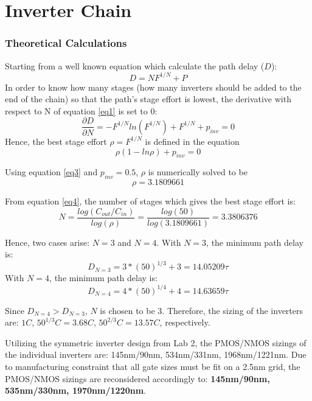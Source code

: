 \documentclass[letterpaper, 11pt]{article}
\begin{document}
\part{Inverter Chain}
\label{part1}

\section{Theoretical Calculations}
\label{sec:theoretical}

Starting from a well known equation which calculate the path delay ($D$):
\begin{equation}\label{eq1}
D = NF^{1/N} + P
\end{equation}
In order to know how many stages (how many inverters should be added to the end of the chain) so that the path's stage effort is lowest, the derivative with respect to N of equation \ref{eq1} is set to 0:
\begin{equation}\label{eq2}
\frac{\partial D}{\partial N} = -F^{1/N}ln(F^{1/N}) + F^{1/N} + p_{inv} = 0
\end{equation}
Hence, the best stage effort $\rho = F^{1/N}$ is defined in the equation
\begin{equation}\label{eq3}
\rho(1-ln\rho) + p_{inv} = 0
\end{equation}

Using equation \ref{eq3} and $p_{inv} = 0.5$, $\rho$ is numerically solved to be
\begin{equation}\label{eq4}
\rho = 3.1809661
\end{equation}

From equation \ref{eq4}, the number of stages which gives the best stage effort is:
\begin{equation}\label{eq5}
N = \frac{log(C_{out}/C_{in})}{log(\rho)} = \frac{log(50)}{log(3.1809661)} = 3.3806376
\end{equation}

Hence, two cases arise: $N=3$ and $N=4$. With $N=3$, the minimum path delay is:
$$D_{N=3} = 3*(50)^{1/3} + 3 = 14.05209\tau$$
With $N=4$, the minimum path delay is:
$$D_{N=4} = 4*(50)^{1/4} + 4 = 14.63659\tau$$

Since $D_{N=4} > D_{N=3}$, $N$ is chosen to be 3. Therefore, the sizing of the inverters are: $1C$, $50^{1/3}C = 3.68C$, $50^{2/3}C = 13.57C$, respectively.

Utilizing the symmetric inverter design from Lab 2, the PMOS/NMOS sizings of the individual inverters are: 145nm/90nm, 534nm/331nm, 1968nm/1221nm. Due to manufacturing constraint that all gate sizes must be fit on a 2.5nm grid, the PMOS/NMOS sizings are reconsidered accordingly to: \textbf{145nm/90nm, 535nm/330nm, 1970nm/1220nm}.
\end{document}
